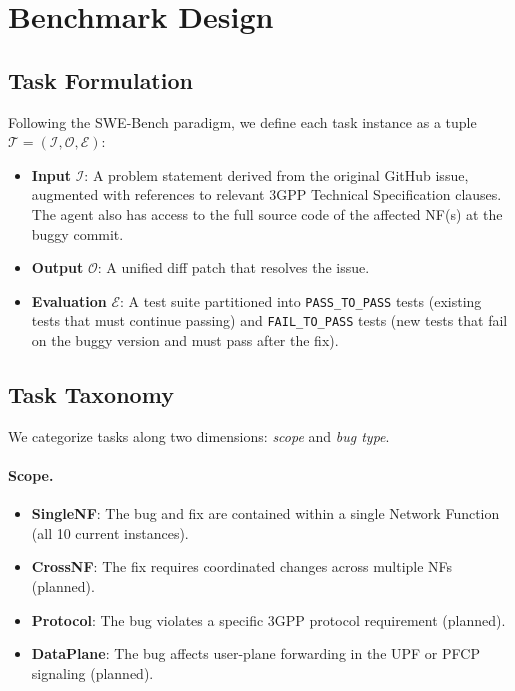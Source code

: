 \documentclass{article}
\begin{document}
\section{Benchmark Design}

\subsection{Task Formulation}

Following the SWE-Bench paradigm, we define each task instance as a tuple $\mathcal{T} = (\mathcal{I}, \mathcal{O}, \mathcal{E})$:

\begin{itemize}
    \item \textbf{Input} $\mathcal{I}$: A problem statement derived from the original GitHub issue, augmented with references to relevant 3GPP Technical Specification clauses. The agent also has access to the full source code of the affected NF(s) at the buggy commit.
    \item \textbf{Output} $\mathcal{O}$: A unified diff patch that resolves the issue.
    \item \textbf{Evaluation} $\mathcal{E}$: A test suite partitioned into \texttt{PASS\_TO\_PASS} tests (existing tests that must continue passing) and \texttt{FAIL\_TO\_PASS} tests (new tests that fail on the buggy version and must pass after the fix).
\end{itemize}

\subsection{Task Taxonomy}

We categorize tasks along two dimensions: \emph{scope} and \emph{bug type}.

\paragraph{Scope.}
\begin{itemize}
    \item \textbf{SingleNF}: The bug and fix are contained within a single Network Function (all 10 current instances).
    \item \textbf{CrossNF}: The fix requires coordinated changes across multiple NFs (planned).
    \item \textbf{Protocol}: The bug violates a specific 3GPP protocol requirement (planned).
    \item \textbf{DataPlane}: The bug affects user-plane forwarding in the UPF or PFCP signaling (planned).
\end{itemize}
\end{document}
